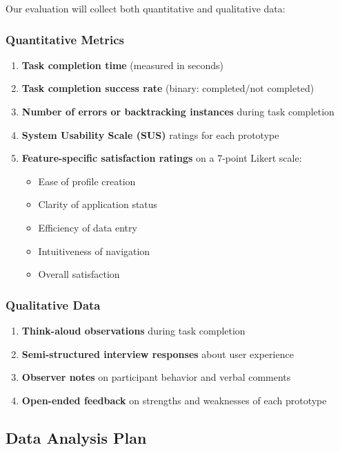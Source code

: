 \documentclass[
	letterpaper, %
]{jdf}
\begin{document}
Our evaluation will collect both quantitative and qualitative data:

\subsubsection{Quantitative Metrics}
\begin{enumerate}
    \item \textbf{Task completion time} (measured in seconds)
    \item \textbf{Task completion success rate} (binary: completed/not completed)
    \item \textbf{Number of errors or backtracking instances} during task completion
    \item \textbf{System Usability Scale (SUS)} ratings for each prototype
    \item \textbf{Feature-specific satisfaction ratings} on a 7-point Likert scale:
    \begin{itemize}
        \item Ease of profile creation
        \item Clarity of application status
        \item Efficiency of data entry
        \item Intuitiveness of navigation
        \item Overall satisfaction
    \end{itemize}
\end{enumerate}

\subsubsection{Qualitative Data}
\begin{enumerate}
    \item \textbf{Think-aloud observations} during task completion
    \item \textbf{Semi-structured interview responses} about user experience
    \item \textbf{Observer notes} on participant behavior and verbal comments
    \item \textbf{Open-ended feedback} on strengths and weaknesses of each prototype
\end{enumerate}

\subsection{Data Analysis Plan}
\end{document}
